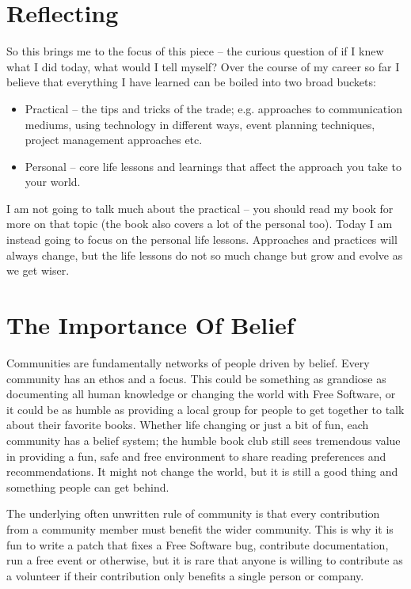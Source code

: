 \section*{Reflecting}

So this brings me to the focus of this piece -- the curious question of if I knew what I did today, what would I tell myself? Over the course of my career so far I believe that everything I have learned can be boiled into two broad buckets:
\begin{itemize}
 \item Practical -- the tips and tricks of the trade; e.g. approaches to
communication mediums, using technology in different ways, event planning
techniques, project management approaches etc.
 \item Personal -- core life lessons and learnings that affect the approach you
take to your world.
\end{itemize}
I am not going to talk much about the practical -- you should read my
book for more on that topic (the book also covers a lot of the personal too).
Today I am instead going to focus on the personal life lessons. Approaches and
practices will always change, but the life lessons do not so much change but
grow and evolve as we get wiser.

\section*{The Importance Of Belief}

Communities are fundamentally networks of people driven by belief. Every
community has an ethos and a focus. This could be something as grandiose as
documenting all human knowledge or changing the world with Free Software, or it
could be as humble as providing a local group for people to get together to talk
about their favorite books. Whether life changing or just a bit of fun, each
community has a belief system; the humble book club still sees tremendous value
in providing a fun, safe and free environment to share reading preferences and
recommendations. It might not change the world, but it is still a good thing and
something people can get behind.

The underlying often unwritten rule of community is that every contribution from
a community member must benefit the wider community. This is why it is fun to
write a patch that fixes a Free Software bug, contribute documentation, run a
free event or otherwise, but it is rare that anyone is willing to contribute as
a volunteer if their contribution only benefits a single person or company.

